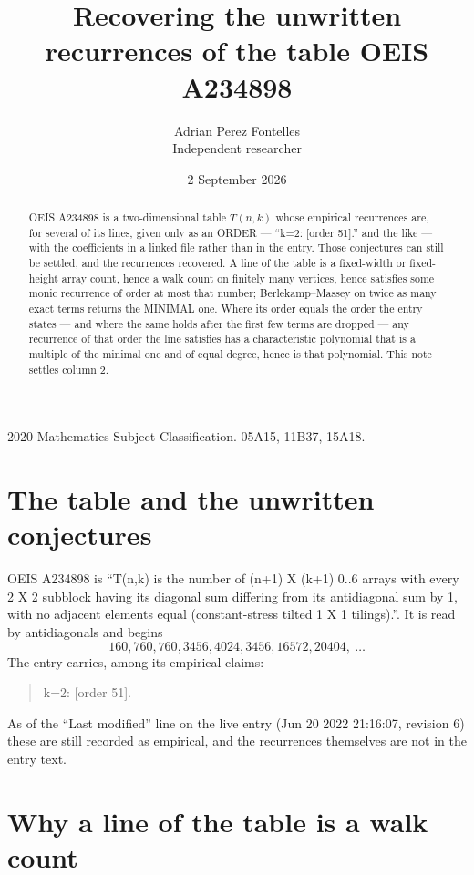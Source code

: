\documentclass[11pt,a4paper]{article}
\title{Recovering the unwritten recurrences of the table OEIS A234898}
\author{Adrian Perez Fontelles\\ \small Independent researcher}
\date{2 September 2026}
\theoremstyle{plain}
\theoremstyle{definition}
\begin{document}
\maketitle

\begin{abstract}
OEIS A234898 is a two-dimensional table $T(n,k)$ whose empirical recurrences are, for several of
its lines, given only as an ORDER --- ``k=2: [order 51].'' and the like --- with the
coefficients in a linked file rather than in the entry. Those conjectures can still be settled,
and the recurrences recovered. A line of the table is a fixed-width or fixed-height array
count, hence a walk count on finitely many vertices, hence satisfies some monic recurrence of
order at most that number; Berlekamp--Massey on twice as many exact terms returns the MINIMAL
one. Where its order equals the order the entry states --- and where the same holds after the
first few terms are dropped --- any recurrence of that order the line satisfies has a
characteristic polynomial that is a multiple of the minimal one and of equal degree, hence is
that polynomial. This note settles column 2.
\end{abstract}

\noindent\small 2020 Mathematics Subject Classification. 05A15, 11B37, 15A18.\normalsize

\section{The table and the unwritten conjectures}

OEIS A234898 is ``T(n,k) is the number of (n+1) X (k+1) 0..6 arrays with every 2 X 2 subblock having its diagonal sum differing from its antidiagonal sum by 1, with no adjacent elements equal (constant-stress tilted 1 X 1 tilings).''. It is read by antidiagonals and begins
\[
160, 760, 760, 3456, 4024, 3456, 16572, 20404,\ \dots
\]
The entry carries, among its empirical claims:
\begin{quote}\small
k=2: [order 51].
\end{quote}
As of the ``Last modified'' line on the live entry (Jun 20 2022 21:16:07, revision 6) these are still
recorded as empirical, and the recurrences themselves are not in the entry text.

\section{Why a line of the table is a walk count}
\end{document}
